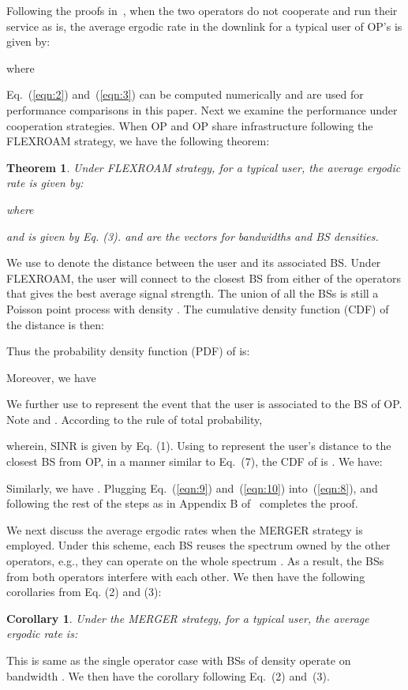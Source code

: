 \documentclass[conference]{IEEEtran}
\newtheorem{theorem}{\textbf{Theorem}}
\newtheorem{corollary}{\textbf{Corollary}}
\begin{document}
Following the proofs in~\cite{Jeffrey@TCOM10}, when the two operators do not cooperate and run their service as is, the average ergodic rate in the downlink for a typical user of OP's is given by:

where


Eq.~(\ref{eqn:2}) and~(\ref{eqn:3}) can be computed numerically and are used for performance comparisons in this paper. Next we examine the performance under cooperation strategies. When OP and OP share infrastructure following the FLEXROAM strategy, we have the following theorem:
\begin{theorem}
Under FLEXROAM strategy, for a typical user, the average ergodic rate is given by:

where

and  is given by Eq. (3).  and  are the vectors for bandwidths and BS densities.
\end{theorem}
\begin{IEEEproof}
We use  to denote the distance between the user and its associated BS. Under FLEXROAM, the user will connect to the closest BS from either of the operators that gives the best average signal strength. The union of all the BSs is still a Poisson point process  with density . The cumulative density function (CDF) of the distance  is then:

Thus the probability density function (PDF) of  is:

Moreover, we have

We further use  to represent the event that the user is associated to the BS of OP. Note  and . According to the rule of total probability,

wherein, SINR is given by Eq. (1). Using  to represent the user's distance to the closest BS from OP, in a manner similar to Eq.~(7), the CDF of  is . We have:

Similarly, we have . Plugging Eq.~(\ref{eqn:9}) and~(\ref{eqn:10}) into~(\ref{eqn:8}), and following the rest of the steps as in Appendix B of~\cite{Jeffrey@TCOM10} completes the proof.
\end{IEEEproof}

We next discuss the average ergodic rates when the MERGER strategy is employed. Under this scheme, each BS reuses the spectrum owned by the other operators, e.g., they can operate on the whole spectrum . As a result, the BSs from both operators interfere with each other. We then have the following corollaries from Eq. (2) and (3):
\begin{corollary}
Under the MERGER strategy, for a typical user, the average ergodic rate is:

\end{corollary}
\begin{IEEEproof}
This is same as the single operator case with BSs of density  operate on bandwidth . We then have the corollary following Eq.~(2) and~(3).
\end{IEEEproof}
\end{document}
